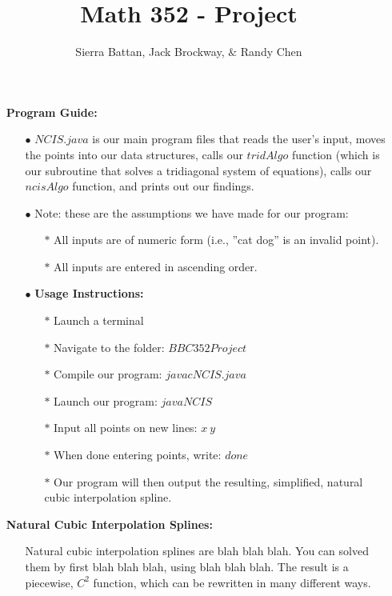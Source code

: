 \documentclass{amsart}
\begin{document}
\title{Math 352 - Project}
\author{Sierra Battan, Jack Brockway, \(\&\) Randy Chen}
\maketitle

\begin{enumerate}

	\item[] \textbf{Program Guide:}
	\begin{enumerate}
		\item[\(\bullet\)] \(NCIS.java\) is our main program files that reads the user's input, moves the points into our data structures, calls our \(tridAlgo\) function (which is our subroutine that solves a tridiagonal system of equations), calls our \(ncisAlgo\) function, and prints out our findings.
		\item[\(\bullet\)] Note: these are the assumptions we have made for our program:
		\begin{enumerate}
			\item[\(*\)] All inputs are of numeric form (i.e., ''cat dog'' is an invalid point).
			\item[\(*\)] All inputs are entered in ascending order.
		\end{enumerate}
		\item[\(\bullet\)] \textbf{Usage Instructions:}
		\begin{enumerate}
			\item[\(*\)] Launch a terminal
			\item[\(*\)] Navigate to the folder: \(BBC352Project\)
			\item[\(*\)] Compile our program: \(javac NCIS.java\)
			\item[\(*\)] Launch our program: \(java NCIS\)
			\item[\(*\)] Input all points on new lines: \(x \ y\)
			\item[\(*\)] When done entering points, write: \(done\)
			\item[\(*\)] Our program will then output the resulting, simplified, natural cubic interpolation spline. \smiley
		\end{enumerate}
	\end{enumerate}
	
	\smallskip
	\item[] \textbf{Natural Cubic Interpolation Splines:}
	\begin{enumerate} 
		\item[] Natural cubic interpolation splines are blah blah blah. You can solved them by first blah blah blah, using blah blah blah. The result is a piecewise, \(C^2\) function, which can be rewritten in many different ways.  
	\end{enumerate}
		

\end{enumerate}
\end{document}
